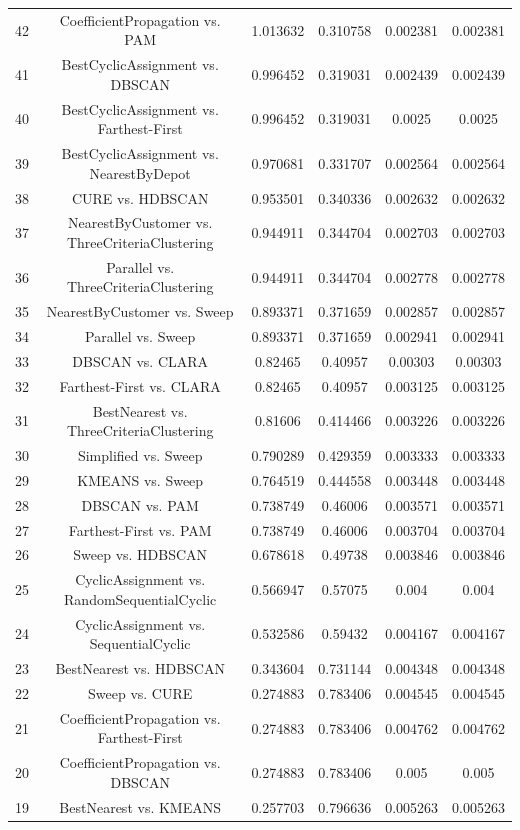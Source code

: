\documentclass[a4paper,10pt]{article}
\begin{document}
\begin{landscape}
\begin{table}[!htp]
\begin{tabular}{cccccc}
42&CoefficientPropagation vs. PAM&1.013632&0.310758&0.002381&0.002381\\
41&BestCyclicAssignment vs. DBSCAN&0.996452&0.319031&0.002439&0.002439\\
40&BestCyclicAssignment vs. Farthest-First&0.996452&0.319031&0.0025&0.0025\\
39&BestCyclicAssignment vs. NearestByDepot&0.970681&0.331707&0.002564&0.002564\\
38&CURE vs. HDBSCAN&0.953501&0.340336&0.002632&0.002632\\
37&NearestByCustomer vs. ThreeCriteriaClustering&0.944911&0.344704&0.002703&0.002703\\
36&Parallel vs. ThreeCriteriaClustering&0.944911&0.344704&0.002778&0.002778\\
35&NearestByCustomer vs. Sweep&0.893371&0.371659&0.002857&0.002857\\
34&Parallel vs. Sweep&0.893371&0.371659&0.002941&0.002941\\
33&DBSCAN vs. CLARA&0.82465&0.40957&0.00303&0.00303\\
32&Farthest-First vs. CLARA&0.82465&0.40957&0.003125&0.003125\\
31&BestNearest vs. ThreeCriteriaClustering&0.81606&0.414466&0.003226&0.003226\\
30&Simplified vs. Sweep&0.790289&0.429359&0.003333&0.003333\\
29&KMEANS vs. Sweep&0.764519&0.444558&0.003448&0.003448\\
28&DBSCAN vs. PAM&0.738749&0.46006&0.003571&0.003571\\
27&Farthest-First vs. PAM&0.738749&0.46006&0.003704&0.003704\\
26&Sweep vs. HDBSCAN&0.678618&0.49738&0.003846&0.003846\\
25&CyclicAssignment vs. RandomSequentialCyclic&0.566947&0.57075&0.004&0.004\\
24&CyclicAssignment vs. SequentialCyclic&0.532586&0.59432&0.004167&0.004167\\
23&BestNearest vs. HDBSCAN&0.343604&0.731144&0.004348&0.004348\\
22&Sweep vs. CURE&0.274883&0.783406&0.004545&0.004545\\
21&CoefficientPropagation vs. Farthest-First&0.274883&0.783406&0.004762&0.004762\\
20&CoefficientPropagation vs. DBSCAN&0.274883&0.783406&0.005&0.005\\
19&BestNearest vs. KMEANS&0.257703&0.796636&0.005263&0.005263\\

\end{tabular}
\end{table}
\end{landscape}
\end{document}
